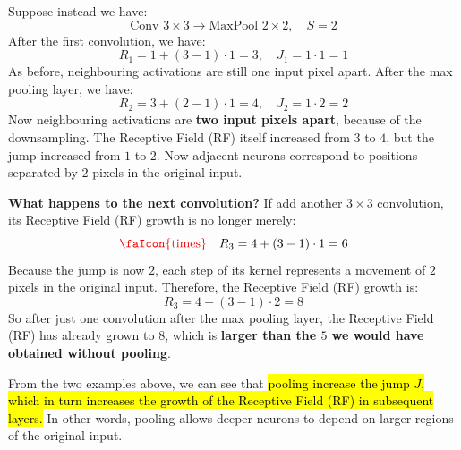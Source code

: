 \highspace
\begin{examplebox}[: Convolution with downsampling ($\text{stride } = 2$)]
    Suppose instead we have:
    \begin{equation*}
        \text{Conv } 3 \times 3 \to \text{MaxPool } 2 \times 2, \quad S = 2
    \end{equation*}
    After the first convolution, we have:
    \begin{equation*}
        R_1 = 1 + (3 - 1) \cdot 1 = 3, \quad J_1 = 1 \cdot 1 = 1
    \end{equation*}
    As before, neighbouring activations are still one input pixel apart. After the max pooling layer, we have:
    \begin{equation*}
        R_2 = 3 + (2 - 1) \cdot 1 = 4, \quad J_2 = 1 \cdot 2 = 2
    \end{equation*}
    Now neighbouring activations are \textbf{two input pixels apart}, because of the downsampling. The Receptive Field (RF) itself increased from $3$ to $4$, but the jump increased from $1$ to $2$. Now adjacent neurons correspond to positions separated by $2$ pixels in the original input.

    \highspace
    \textcolor{DarkOrange3}{ \textbf{What happens to the next convolution?}} If add another $3 \times 3$ convolution, its Receptive Field (RF) growth is no longer merely:
    \begin{equation*}
        \text{\textcolor{Red2}{\faIcon{times}}} \quad R_3 = 4 + (3 - 1) \cdot 1 = 6
    \end{equation*}
    Because the jump is now $2$, each step of its kernel represents a movement of $2$ pixels in the original input. Therefore, the Receptive Field (RF) growth is:
    \begin{equation*}
        R_{3} = 4 + (3 - 1) \cdot 2 = 8
    \end{equation*}
    So after just one convolution after the max pooling layer, the Receptive Field (RF) has already grown to $8$, which is \textbf{larger than the $5$ we would have obtained without pooling}.
\end{examplebox}

\highspace
From the two examples above, we can see that \hl{pooling increase the jump $J$, which in turn increases the growth of the Receptive Field (RF) in subsequent layers.} In other words, pooling allows deeper neurons to depend on larger regions of the original input.

